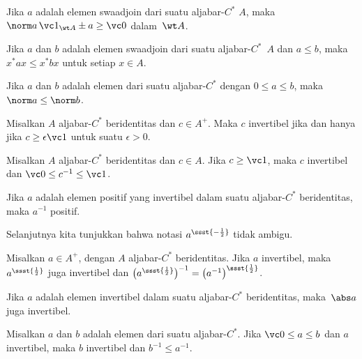 \begin{prop}\label{0018203} Jika $a$ adalah elemen swaadjoin dari suatu aljabar-$C^*$ $A$, maka
$\norm a\,\vc 1_{\wt A} \pm a \ge \vc 0$ dalam~$\wt A$.
\end{prop}

\begin{prop}\label{0018204} Jika $a$ dan $b$ adalah elemen swaadjoin dari suatu
aljabar-$C^*$~$A$ dan $a \le b$, maka $x^*ax \le x^*bx$ untuk setiap $x \in A$.
\end{prop}

\begin{prop} Jika $a$ dan $b$ adalah elemen dari suatu aljabar-$C^*$ dengan $0 \le a \le b$, maka
$\norm a \le \norm b$.
\end{prop}

\begin{prop}\label{0018301} Misalkan $A$ aljabar-$C^*$ beridentitas dan $c \in A^+$. Maka
$c$ invertibel jika dan hanya jika $c \ge \epsilon\vc 1$ untuk suatu $\epsilon > 0$.
\end{prop}

\begin{prop} Misalkan $A$ aljabar-$C^*$ beridentitas dan $c \in A$. Jika $c \ge \vc 1$, maka $c$
invertibel dan $\vc 0 \le c^{-1} \le \vc 1$.
\end{prop}

\begin{prop} Jika $a$ adalah elemen positif yang invertibel dalam suatu aljabar-$C^*$ beridentitas, maka $a^{-1}$
positif.
\end{prop}

Selanjutnya kita tunjukkan bahwa notasi $a^{\ssst{-\frac12}}$ tidak ambigu.

\begin{prop} Misalkan $a \in A^+$, dengan $A$ aljabar-$C^*$ beridentitas. Jika $a$ invertibel, maka
$a^{\ssst{\frac12}}$ juga invertibel dan $\bigl(a^{\ssst{\frac12}}\bigr)^{-1} =
\bigl(a^{-1}\bigr)^{\ssst{\frac12}}$.
\end{prop}

\begin{cor}\label{00183313} Jika $a$ adalah elemen invertibel dalam suatu aljabar-$C^*$ beridentitas,
maka~$\abs a$ juga invertibel.
\end{cor}

\begin{prop}\label{0018401} Misalkan $a$ dan $b$ adalah elemen dari suatu aljabar-$C^*$. Jika
$\vc 0 \le a \le b$ dan $a$ invertibel, maka $b$ invertibel dan $b^{-1} \le
a^{-1}$.
\end{prop}

